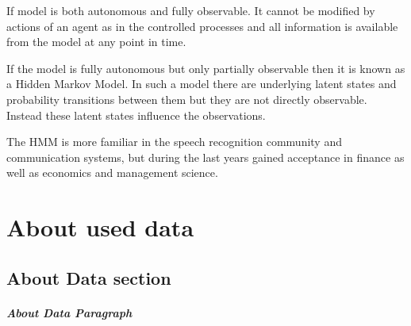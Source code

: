 \documentclass{report}
\begin{document}
If model is both autonomous and fully observable. It cannot be modified by actions of an agent as in the controlled processes and all information is available from the model at any point in time.

If the model is fully autonomous but only partially observable then it is known as a Hidden Markov Model. In such a model there are underlying latent states and probability transitions between them but they are not directly observable. Instead these latent states influence the observations. 

The HMM is more familiar in the speech recognition community and communication systems, but during the last years gained acceptance in finance as well as economics and management science.


\chapter{About used data}
\section{About Data section}
\paragraph{About Data Paragraph}
\end{document}
